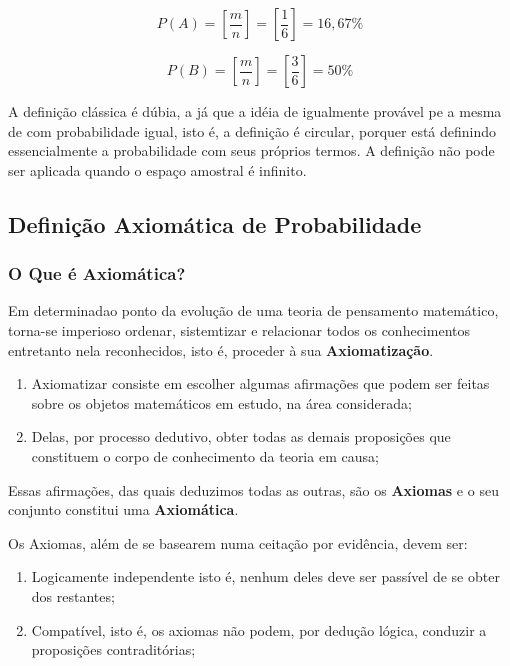 $$
P(A)= \left[ \frac{m}{n} \right] = \left[  \frac{1}{6} \right] = 16,67\% 
$$

$$
P(B)= \left[ \frac{m}{n} \right] = \left[ \frac{3}{6} \right] =  50\%
$$





\inic A definição clássica é dúbia, a já que a idéia de igualmente provável pe a mesma de com probabilidade igual, isto é, a definição é circular, porquer está definindo essencialmente a probabilidade com seus próprios termos. A definição não pode ser aplicada quando o espaço amostral é infinito.


 \newpage
\subsection{Definição Axiomática de Probabilidade}
\subsubsection{O Que é Axiomática?}

\inic Em determinadao ponto da evolução de uma teoria de pensamento matemático, torna-se imperioso ordenar, sistemtizar e relacionar todos os conhecimentos entretanto nela reconhecidos, isto é, proceder à sua \textbf{Axiomatização}. 
 
\begin{enumerate}
\item Axiomatizar consiste em escolher algumas afirmações que podem ser feitas sobre os objetos matemáticos em estudo, na área considerada;
\item Delas, por processo dedutivo, obter todas as demais proposições que constituem o corpo de conhecimento da teoria em causa;
\end{enumerate} 

\inic Essas afirmações, das quais deduzimos todas as outras, são os \textbf{Axiomas} e o seu conjunto constitui uma \textbf{Axiomática}.\vskip0.3cm
 

\inic Os Axiomas, além de se basearem numa ceitação por evidência, devem ser:

\begin{enumerate}
    \item Logicamente independente isto é, nenhum deles deve ser passível de se obter dos restantes;
    \item Compatível, isto é, os axiomas não podem, por dedução lógica, conduzir a proposições contraditórias; 
\end{enumerate}
 
